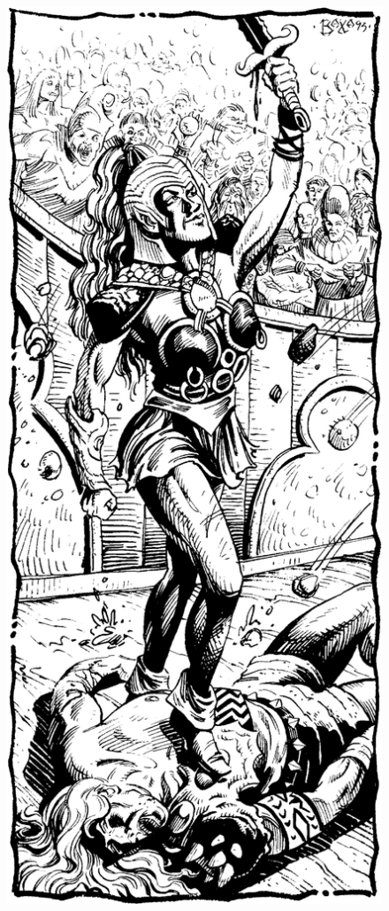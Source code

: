\begin{figure}[b!]
\centering
\includegraphics[width=\columnwidth]{images/gladiator-2.png}
\WOTC
\end{figure}

